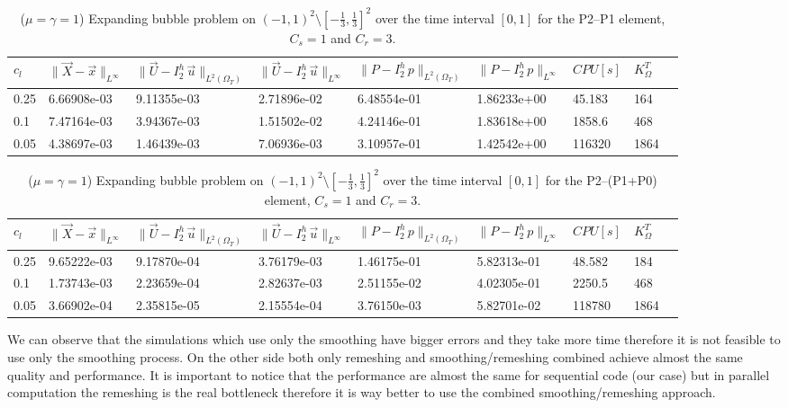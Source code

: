 \documentclass[a4paper,12pt,onecolumn]{article}
\newcommand{\errorXx}{\|\vec{X} - \vec{x}\|_{L^\infty}}
\newcommand{\LerrorUu}[1]{\|\vec U - I^h_{#1}\,\vec u\|_{L^2(\Omega_T)}}
\newcommand{\errorUu}[1]{\|\vec U - I^h_{#1}\,\vec u\|_{L^\infty}}
\newcommand{\errorPp}[1]{\|P - I^h_{#1}\,p\|_{L^\infty}}
\newcommand{\LerrorPp}[1]{\|P - I^h_{#1}\,p\|_{L^2(\Omega_T)}}
\begin{document}
\begin{table}
 \center
 \hspace*{-2cm}
\begin{tabular}{lllllllll}
\hline
$c_l$ & $\errorXx$ & $\LerrorUu2$ & $\errorUu2$ & $\LerrorPp2$ & $\errorPp2$ & $CPU[s]$ & $K_\Omega^T$\\
\hline
0.25 & 6.66908e-03 & 9.11355e-03 & 2.71896e-02 & 6.48554e-01 & 1.86233e+00 & 45.183 & 164\\
0.1 & 7.47164e-03 & 3.94367e-03 & 1.51502e-02 & 4.24146e-01 & 1.83618e+00 & 1858.6 & 468\\
0.05 & 4.38697e-03 & 1.46439e-03 & 7.06936e-03 & 3.10957e-01 & 1.42542e+00 & 116320 & 1864\\
\hline
\end{tabular}
\hspace*{-2cm}
\caption{($\mu=\gamma=1$) Expanding bubble problem on $(-1,1)^2\setminus[-\frac{1}{3},\frac{1}{3}]^2$ over the time interval $[0,1]$ for the P2--P1 element, $C_s=1$ and $C_r=3$.}
\label{tab:expandingbubble2Dp2p1all}
\end{table}

\begin{table}
 \center
 \hspace*{-2cm}
\begin{tabular}{lllllllll}
\hline
$c_l$ & $\errorXx$ & $\LerrorUu2$ & $\errorUu2$ & $\LerrorPp2$ & $\errorPp2$ & $CPU[s]$ & $K_\Omega^T$\\
\hline
0.25 & 9.65222e-03 & 9.17870e-04 & 3.76179e-03 & 1.46175e-01 & 5.82313e-01 & 48.582 & 184\\
0.1 & 1.73743e-03 & 2.23659e-04 & 2.82637e-03 & 2.51155e-02 & 4.02305e-01 & 2250.5 & 468\\
0.05 & 3.66902e-04 & 2.35815e-05 & 2.15554e-04 & 3.76150e-03 & 5.82701e-02 & 118780 & 1864\\
\hline
\end{tabular}
\hspace*{-2cm}
\caption{($\mu=\gamma=1$) Expanding bubble problem on $(-1,1)^2\setminus[-\frac{1}{3},\frac{1}{3}]^2$ over the time interval $[0,1]$ for the P2--(P1+P0) element, $C_s=1$ and $C_r=3$.}
\label{tab:expandingbubble2Dp2p1p0all}
\end{table}

We can observe that the simulations which use only the smoothing have bigger errors and they take more time therefore it is not feasible to use only the smoothing process. On the other side both only remeshing and smoothing/remeshing combined achieve almost the same quality and performance. It is important to notice that the performance are almost the same for sequential code (our case) but in parallel computation the remeshing is the real bottleneck therefore it is way better to use the combined smoothing/remeshing approach.  
\newline
\end{document}
